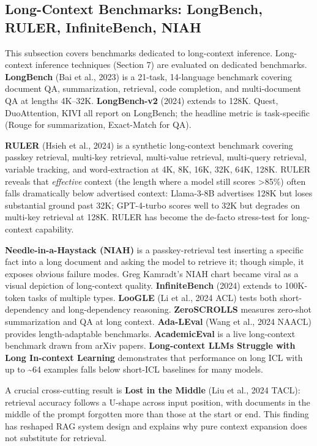 \documentclass{article}
\begin{document}
\subsection{Long-Context Benchmarks: LongBench, RULER, InfiniteBench, NIAH}\label{long-context-benchmarks-longbench-ruler-infinitebench-niah}

This subsection covers benchmarks dedicated to long-context inference. Long-context inference techniques (Section 7) are evaluated on dedicated benchmarks. \textbf{LongBench} (Bai et al., 2023) is a 21-task, 14-language benchmark covering document QA, summarization, retrieval, code completion, and multi-document QA at lengths 4K--32K. \textbf{LongBench-v2} (2024) extends to 128K. Quest, DuoAttention, KIVI all report on LongBench; the headline metric is task-specific (Rouge for summarization, Exact-Match for QA).

\textbf{RULER} (Hsieh et al., 2024) is a synthetic long-context benchmark covering passkey retrieval, multi-key retrieval, multi-value retrieval, multi-query retrieval, variable tracking, and word-extraction at 4K, 8K, 16K, 32K, 64K, 128K. RULER reveals that \emph{effective} context (the length where a model still scores \textgreater85\%) often falls dramatically below advertised context: Llama-3-8B advertises 128K but loses substantial ground past 32K; GPT-4-turbo scores well to 32K but degrades on multi-key retrieval at 128K. RULER has become the de-facto stress-test for long-context capability.

\textbf{Needle-in-a-Haystack (NIAH)} is a passkey-retrieval test inserting a specific fact into a long document and asking the model to retrieve it; though simple, it exposes obvious failure modes. Greg Kamradt's NIAH chart became viral as a visual depiction of long-context quality. \textbf{InfiniteBench} (2024) extends to 100K-token tasks of multiple types. \textbf{LooGLE} (Li et al., 2024 ACL) tests both short-dependency and long-dependency reasoning. \textbf{ZeroSCROLLS} measures zero-shot summarization and QA at long context. \textbf{Ada-LEval} (Wang et al., 2024 NAACL) provides length-adaptable benchmarks. \textbf{AcademicEval} \citep{zhang20252025} is a live long-context benchmark drawn from arXiv papers. \textbf{Long-context LLMs Struggle with Long In-context Learning} \citep{li20242024} demonstrates that performance on long ICL with up to \textasciitilde64 examples falls below short-ICL baselines for many models.

A crucial cross-cutting result is \textbf{Lost in the Middle} (Liu et al., 2024 TACL): retrieval accuracy follows a U-shape across input position, with documents in the middle of the prompt forgotten more than those at the start or end. This finding has reshaped RAG system design and explains why pure context expansion does not substitute for retrieval.
\end{document}
